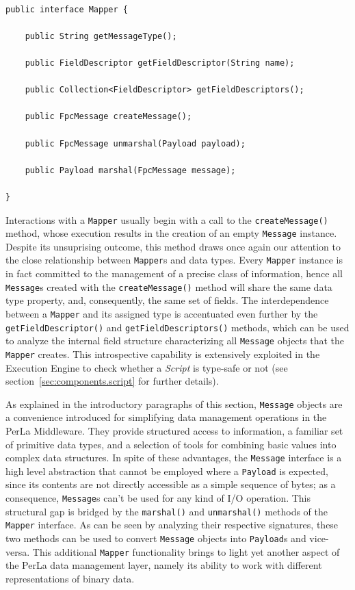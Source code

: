 ~\\
\lstset{language=Java}
\begin{lstlisting}[floatplacement=!hbt,caption=The Mapper
interface,label={lst:mapper}]
public interface Mapper {

    public String getMessageType();

    public FieldDescriptor getFieldDescriptor(String name);

    public Collection<FieldDescriptor> getFieldDescriptors();

    public FpcMessage createMessage();

    public FpcMessage unmarshal(Payload payload);

    public Payload marshal(FpcMessage message);

}
\end{lstlisting}

Interactions with a \texttt{Mapper} usually begin with a call to the
\texttt{createMessage()} method, whose execution results in the creation of an
empty \texttt{Message} instance. Despite its unsuprising outcome, this method
draws once again our attention to the close relationship between
\texttt{Mapper}s and data types. Every \texttt{Mapper} instance is in fact
committed to the management of a precise class of information, hence all
\texttt{Message}s created with the \texttt{createMessage()} method will share
the same data type property, and, consequently, the same set of fields. The
interdependence between a \texttt{Mapper} and its assigned type is accentuated
even further by the \texttt{getFieldDescriptor()} and
\texttt{getFieldDescriptors()} methods, which can be used to analyze the
internal field structure characterizing all \texttt{Message} objects that the
\texttt{Mapper} creates. This introspective capability is extensively exploited
in the Execution Engine to check whether a \textit{Script} is type-safe or not
(see section~\ref{sec:components.script} for further details).

As explained in the introductory paragraphs of this section, \texttt{Message}
objects are a convenience introduced for simplifying data management operations
in the PerLa Middleware. They provide structured access to information, a
familiar set of primitive data types, and a selection of tools for combining
basic values into complex data structures. In spite of these advantages, the
\texttt{Message} interface is a high level abstraction that cannot be employed
where a \texttt{Payload} is expected, since its contents are not directly
accessible as a simple sequence of bytes; as a consequence, \texttt{Message}s
can't be used for any kind of I/O operation. This structural gap is bridged by
the \texttt{marshal()} and \texttt{unmarshal()} methods of the \texttt{Mapper}
interface. As can be seen by analyzing their respective signatures, these two
methods can be used to convert \texttt{Message} objects into \texttt{Payload}s
and vice-versa. This additional \texttt{Mapper} functionality brings to light
yet another aspect of the PerLa data management layer, namely its ability to
work with different representations of binary data.

